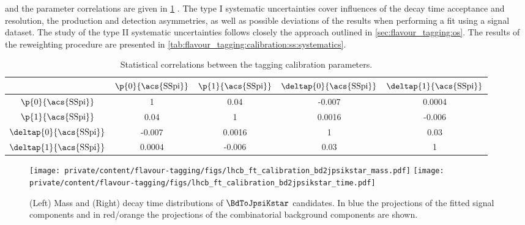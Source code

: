 \endgroup
%
and the parameter correlations are given in
\cref{tab:flavour_tagging:calibration:ss:correlations} \cite{Aaij:2015vza}. The
type I systematic uncertainties cover influences of the decay time acceptance
and resolution, the production and detection asymmetries, as well as possible
deviations of the results when performing a fit using a signal \sweighted
dataset. The study of the type II systematic uncertainties follows closely the
approach outlined in \cref{sec:flavour_tagging:os}. The results of the
reweighting procedure are presented in
\cref{tab:flavour_tagging:calibration:ss:systematics}.
%
\begin{table}
  \centering
  \caption{Statistical correlations between the \SSpi tagging calibration parameters. \cite{Aaij:2015vza}}
  \label{tab:flavour_tagging:calibration:ss:correlations}
  \begin{tabular}{ccccc}
    \toprule
    & $\p{0}{\text{\acs{SSpi}}}$ & $\p{1}{\text{\acs{SSpi}}}$ & $\deltap{0}{\text{\acs{SSpi}}}$ & $\deltap{1}{\text{\acs{SSpi}}}$ \\
    \midrule
    $\p{0}{\text{\acs{SSpi}}}$ & 1 & 0.04 & -0.007 & 0.0004 \\
    $\p{1}{\text{\acs{SSpi}}}$ & 0.04 & 1 & 0.0016 & -0.006 \\
    $\deltap{0}{\text{\acs{SSpi}}}$ & -0.007 & 0.0016 & 1 & 0.03 \\
    $\deltap{1}{\text{\acs{SSpi}}}$ & 0.0004 & -0.006 & 0.03 & 1 \\
    \bottomrule
  \end{tabular}
\end{table}
%
\begin{figure}[t]
  \texttt{[image: private/content/flavour-tagging/figs/lhcb\_ft\_calibration\_bd2jpsikstar\_mass.pdf]}
  \texttt{[image: private/content/flavour-tagging/figs/lhcb\_ft\_calibration\_bd2jpsikstar\_time.pdf]}
  \caption{(Left) Mass and (Right) decay time distributions of $\BdToJpsiKstar$
  candidates. In blue the projections of the fitted signal components and in
  red/orange the projections of the combinatorial background components are
  shown. \cite{Aaij:2015vza}}
  \label{fig:flavour_tagging:calibration:ss:fit}
\end{figure}
%

